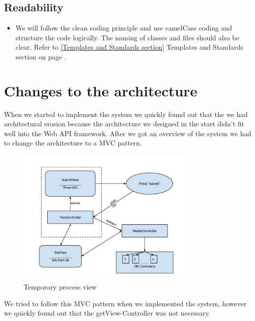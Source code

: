 \subsection{Readability}
\begin{itemize}
\item We will follow the clean coding principle and use camelCase coding and structure the code logically. The naming of classes and files should also be clear. Refer to \ref{Templates and Standards section} Templates and Standards section on page \pageref{Templates and Standards section}.
\end{itemize}

\section{Changes to the architecture}
When we started to implement the system we quickly found out that the we had architectural erosion because the architecture we designed in the start didn't fit well into the Web API framework. After we got an overview of the system we had to change the architecture to a MVC pattern. 
\begin{figure}[H]
\centering
\includegraphics[width=0.8\textwidth]{images/architecture03_revised1.png}
\caption{Temporary process view}
\label{fig:info_flow}
\end{figure}
We tried to follow this MVC pattern when we implemented the system, however we quickly found out that the getView-Controller was not necessary.
